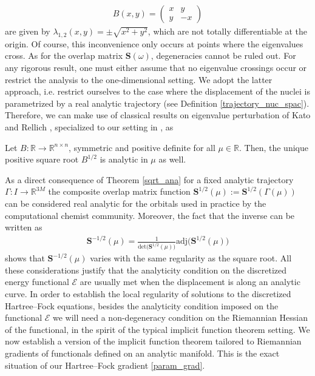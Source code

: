 \documentclass[reqno]{amsart}
\begin{document}
\begin{align*}
    B(x,y)=\begin{pmatrix}
x & y \\
y & -x 
\end{pmatrix}
\end{align*}
are given by $\lambda_{1,2}(x,y)=\pm \sqrt{x^2+y^2}$, which are not totally differentiable at the origin. Of course, this inconvenience only occurs at points where the eigenvalues cross. As for the overlap matrix $\mathbf{S}(\omega)$, degeneracies cannot be ruled out. For any rigorous result, one must either assume that no eigenvalue crossings occur or restrict the analysis to the one-dimensional setting. We adopt the latter approach, i.e. restrict ourselves to the case where the displacement of the nuclei is parametrized by a real analytic trajectory (see Definition \ref{trajectory_nuc_spac}). Therefore, we can make use of classical results on eigenvalue perturbation of Kato and Rellich \cite{Kato:1966:PTL,rellich1969perturbation}, specialized to our setting in \cite{Dieci_Luca}, as
\begin{theorem}\label{sqrt_ana}
    Let $B:\mathbb{R}\longrightarrow \mathbb{R}^{n\times n}$, symmetric and positive definite for all $\mu \in \mathbb{R}$. Then, the unique positive square root $B^{1/2}$ is analytic in $\mu$ as well.
\end{theorem}

 As a direct consequence of Theorem \ref{sqrt_ana} for a fixed analytic trajectory $\Gamma:I\longrightarrow\mathbb{R}^{3M}$ the composite overlap matrix function $\mathbf{S}^{1/2}(\mu):=\mathbf{S}^{1/2}(\Gamma(\mu))$ can be considered real analytic for the orbitals used in practice by the computational chemist community. Moreover, the fact that the inverse can be written as
\begin{align*}
    \mathbf{S}^{-1/2}(\mu)=\frac{1}{\text{det}\big(\mathbf{S}^{1/2}(\mu)\big)}\text{adj}\big(\mathbf{S}^{1/2}(\mu)\big)
\end{align*}
shows that $\mathbf{S}^{-1/2}(\mu)$ varies with the same regularity as the square root. All these considerations justify that the analyticity condition on the discretized energy functional $\mathcal{E}$ are usually met when the displacement is along an analytic curve. In order to establish the local regularity of solutions to the discretized Hartree–Fock equations, besides the analyticity condition imposed on the functional $\mathcal{E}$ we will need a non-degeneracy condition on the Riemannian Hessian of the functional, in the spirit of the typical implicit function theorem setting.  We now establish a version of the implicit function theorem tailored to Riemannian gradients of functionals defined on an analytic manifold. This is the exact situation of our Hartree–Fock  gradient \eqref{param_grad}.
\end{document}

